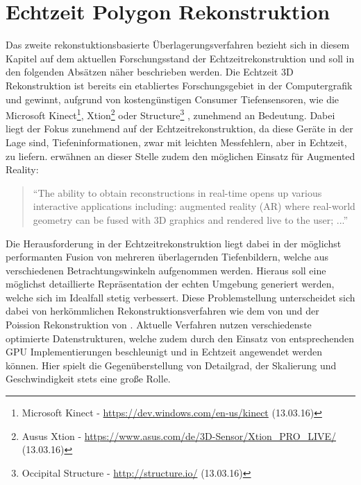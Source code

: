\section{Echtzeit Polygon Rekonstruktion} \label{sec:polygon_reconstruction}

Das zweite rekonstuktionsbasierte Überlagerungsverfahren bezieht sich in diesem Kapitel auf dem aktuellen Forschungsstand der Echtzeitrekonstruktion und soll in den folgenden Absätzen näher beschrieben werden. Die Echtzeit 3D Rekonstruktion ist bereits ein etabliertes Forschungsgebiet in der Computergrafik und gewinnt, aufgrund von kostengünstigen Consumer Tiefensensoren, wie die Microsoft Kinect\footnote{Microsoft Kinect - \url{https://dev.windows.com/en-us/kinect} (13.03.16)}, Xtion\footnote{Ausus Xtion - \url{https://www.asus.com/de/3D-Sensor/Xtion_PRO_LIVE/} (13.03.16)} oder Structure\footnote{Occipital Structure - \url{http://structure.io/} (13.03.16)} , zunehmend an Bedeutung. Dabei liegt der Fokus zunehmend auf der Echtzeitrekonstruktion, da diese Geräte in der Lage sind, Tiefeninformationen, zwar mit leichten Messfehlern, aber in Echtzeit, zu liefern. \citet{niessner2013real} erwähnen an dieser Stelle zudem den möglichen Einsatz für Augmented Reality:

\begin{quote}
\enquote{The ability to obtain reconstructions
in real-time opens up various interactive applications including:
augmented reality (AR) where real-world geometry can be fused
with 3D graphics and rendered live to the user; ...} \citep{niessner2013real}
\end{quote}

Die Herausforderung in der Echtzeitrekonstruktion liegt dabei in der möglichst performanten Fusion von mehreren überlagernden Tiefenbildern, welche aus verschiedenen Betrachtungswinkeln aufgenommen werden. Hieraus soll eine möglichst detaillierte Repräsentation der echten Umgebung generiert werden, welche sich im Idealfall stetig verbessert. Diese Problemstellung unterscheidet sich dabei von herkömmlichen Rekonstruktionsverfahren wie dem von \citet{hoppe1992surface} und der Poission Rekonstruktion von \citet{kazhdan2006poisson}. Aktuelle Verfahren nutzen verschiedenste optimierte Datenstrukturen, welche zudem durch den Einsatz von entsprechenden GPU Implementierungen beschleunigt und in Echtzeit angewendet werden können. Hier spielt die Gegenüberstellung von Detailgrad, der Skalierung und Geschwindigkeit stets eine große Rolle. \citep{niessner2013real} 

